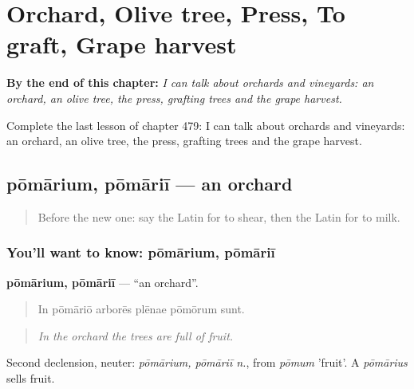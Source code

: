 
\chapter{Orchard, Olive tree, Press, To graft, Grape harvest}
\label{ch:la-orchard-olive-tree-press-to-graft-grape-harvest}

\begin{chapteropening}
\textbf{By the end of this chapter:} \emph{I can talk about orchards and vineyards: an orchard, an olive tree, the press, grafting trees and the grape harvest.}

Complete the last lesson of chapter 479: I can talk about orchards and vineyards: an orchard, an olive tree, the press, grafting trees and the grape harvest.
\end{chapteropening}

\section[pōmārium, pōmāriī]{pōmārium, pōmāriī — an orchard}

\label{lesson:LA-C479-pomarium}



\begin{quote}
Before the new one: say the Latin for to shear, then the Latin for to milk.
\end{quote}

\subsection*{You'll want to know: pōmārium, pōmāriī}
\textbf{pōmārium, pōmāriī} — \textquotedblleft{}an orchard\textquotedblright{}.

\begin{quote}
In pōmāriō arborēs plēnae pōmōrum sunt.
\end{quote}

\begin{quote}
\emph{In the orchard the trees are full of fruit.}
\end{quote}

Second declension, neuter: \emph{pōmārium, pōmāriī n.}, from \emph{pōmum} 'fruit'. A \emph{pōmārius} sells fruit.

